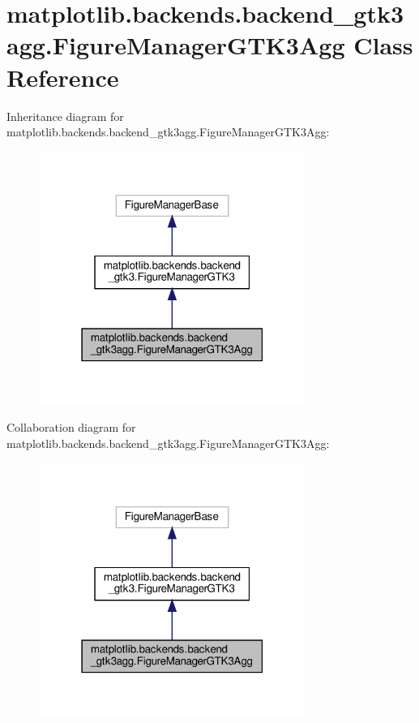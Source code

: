 \hypertarget{classmatplotlib_1_1backends_1_1backend__gtk3agg_1_1FigureManagerGTK3Agg}{}\section{matplotlib.\+backends.\+backend\+\_\+gtk3agg.\+Figure\+Manager\+G\+T\+K3\+Agg Class Reference}
\label{classmatplotlib_1_1backends_1_1backend__gtk3agg_1_1FigureManagerGTK3Agg}


Inheritance diagram for matplotlib.\+backends.\+backend\+\_\+gtk3agg.\+Figure\+Manager\+G\+T\+K3\+Agg\+:
\nopagebreak
\begin{figure}[H]
\begin{center}
\leavevmode
\includegraphics[width=247pt]{classmatplotlib_1_1backends_1_1backend__gtk3agg_1_1FigureManagerGTK3Agg__inherit__graph}
\end{center}
\end{figure}


Collaboration diagram for matplotlib.\+backends.\+backend\+\_\+gtk3agg.\+Figure\+Manager\+G\+T\+K3\+Agg\+:
\nopagebreak
\begin{figure}[H]
\begin{center}
\leavevmode
\includegraphics[width=247pt]{classmatplotlib_1_1backends_1_1backend__gtk3agg_1_1FigureManagerGTK3Agg__coll__graph}
\end{center}
\end{figure}
